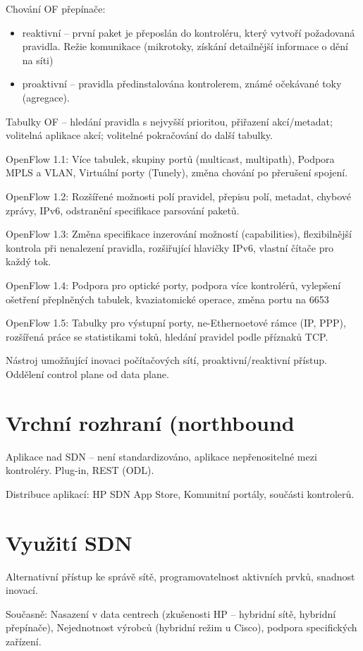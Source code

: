 \documentclass[a4paper, 11pt]{report}
\begin{document}
Chování OF přepínače:
\begin{itemize}
	\item reaktivní -- první paket je přeposlán do kontroléru, který vytvoří požadovaná pravidla. Režie komunikace (mikrotoky, získání detailnější informace o dění na síti)
	\item proaktivní -- pravidla předinstalována kontrolerem, známé očekávané toky (agregace).
\end{itemize}

Tabulky OF -- hledání pravidla s nejvyšší prioritou, přiřazení akcí/metadat; volitelná aplikace akcí; volitelné pokračování do další tabulky.

OpenFlow 1.1: Více tabulek, skupiny portů (multicast, multipath), Podpora MPLS a VLAN, Virtuální porty (Tunely), změna chování po přerušení spojení.

OpenFlow 1.2: Rozšířené možnosti polí pravidel, přepisu polí, metadat, chybové zprávy, IPv6, odstranění specifikace parsování paketů.

OpenFlow 1.3: Změna specifikace inzerování možností (capabilities), flexibilnější kontrola při nenalezení pravidla, rozšiřující hlavičky IPv6, vlastní čítače pro každý tok.

OpenFlow 1.4: Podpora pro optické porty, podpora více kontrolérů, vylepšení ošetření přeplněných tabulek, kvaziatomické operace, změna portu na 6653

OpenFlow 1.5: Tabulky pro výstupní porty, ne-Ethernoetové rámce (IP, PPP), rozšířená práce se statistikami toků, hledání pravidel podle příznaků TCP.

Nástroj umožňující inovaci počítačových sítí, proaktivní/reaktivní přístup. Oddělení control plane od data plane.

\section{Vrchní rozhraní (northbound}
Aplikace nad SDN -- není standardizováno, aplikace nepřenositelné mezi kontroléry. Plug-in, REST (ODL).

Distribuce aplikací: HP SDN App Store, Komunitní portály, součásti kontrolerů.

\section{Využití SDN}
Alternativní přístup ke správě sítě, programovatelnost aktivních prvků, snadnost inovací.

Současně: Nasazení v data centrech (zkušenosti HP -- hybridní sítě, hybridní přepínače), Nejednotnost výrobců (hybridní režim u Cisco), podpora specifických zařízení.
\end{document}
